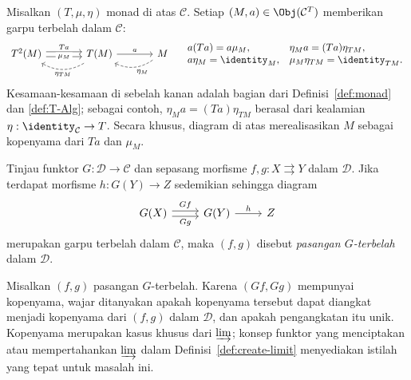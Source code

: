 \begin{example}\label{eg:T-split-fork}
	Misalkan $(T,\mu,\eta)$ monad di atas $\mathcal{C}$. Setiap
	$(M,a)\in\Obj(\mathcal{C}^T)$ memberikan garpu terbelah dalam
	$\mathcal{C}$:
	\begin{equation*}\begin{tikzcd}[column sep=large]
			T^2(M) \arrow[shift left, r, "Ta"] \arrow[shift right, r, "\mu_M" description] & T(M) \arrow[r, "a"] \arrow[dashed, bend left, l, "\eta_{TM}"] & M \arrow[dashed, bend left, l, "\eta_M"]
		\end{tikzcd} \quad \begin{array}{ll}
			a (Ta) = a \mu_M , & \eta_M a = (Ta) \eta_{TM}, \\
			a \eta_M = \identity_M , & \mu_M \eta_{TM} = \identity_{TM}.
		\end{array}\end{equation*}
	Kesamaan-kesamaan di sebelah kanan adalah bagian dari
	Definisi~\ref{def:monad} dan \ref{def:T-Alg}; sebagai contoh,
	$\eta_Ma=(Ta)\eta_{TM}$ berasal dari kealamian
	$\eta:\identity_{\mathcal{C}}\to T$. Secara khusus, diagram di atas
	merealisasikan $M$ sebagai kopenyama dari $Ta$ dan $\mu_M$.
\end{example}

\begin{definition}\label{def:Beck-split-pair}
	Tinjau funktor $G:\mathcal{D}\to\mathcal{C}$ dan sepasang morfisme
	$f,g:X\rightrightarrows Y$ dalam $\mathcal{D}$. Jika terdapat morfisme
	$h:G(Y)\to Z$ sedemikian sehingga diagram
	\begin{equation*}\begin{tikzcd}
			G(X) \arrow[shift left, r, "Gf"] \arrow[shift right, r, "Gg"'] & G(Y) \arrow[r, "h"] & Z
	\end{tikzcd}\end{equation*}
	merupakan garpu terbelah dalam $\mathcal{C}$, maka $(f,g)$ disebut
	\emph{pasangan $G$-terbelah} dalam $\mathcal{D}$.
\end{definition}

Misalkan $(f,g)$ pasangan $G$-terbelah. Karena $(Gf,Gg)$ mempunyai
kopenyama, wajar ditanyakan apakah kopenyama tersebut dapat diangkat menjadi
kopenyama dari $(f,g)$ dalam $\mathcal{D}$, dan apakah pengangkatan itu unik.
Kopenyama merupakan kasus khusus dari $\varinjlim$; konsep funktor yang
menciptakan atau mempertahankan $\varinjlim$ dalam
Definisi~\ref{def:create-limit} menyediakan istilah yang tepat untuk masalah
ini.

